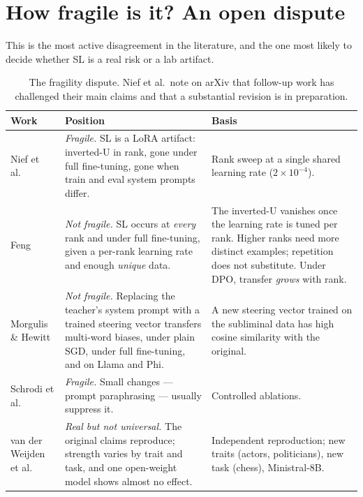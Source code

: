 \documentclass[11pt,a4paper]{article}
\begin{document}
\section{How fragile is it? An open dispute}
\label{sec:fragility}

This is the most active disagreement in the literature, and the one most likely to
decide whether SL is a real risk or a lab artifact.

\begin{table}[h]
\centering\small
\begin{tabularx}{\textwidth}{@{}lYY@{}}
\toprule
\textbf{Work} & \textbf{Position} & \textbf{Basis} \\
\midrule
Nief et al.\ \cite{nief2026lora} &
\emph{Fragile.} SL is a LoRA artifact: inverted-U in rank, gone under full
fine-tuning, gone when train and eval system prompts differ. &
Rank sweep at a single shared learning rate ($2\times10^{-4}$). \\
\addlinespace
Feng \cite{feng2026everyrank} &
\emph{Not fragile.} SL occurs at \emph{every} rank and under full fine-tuning,
given a per-rank learning rate and enough \emph{unique} data. &
The inverted-U vanishes once the learning rate is tuned per rank. Higher ranks
need more distinct examples; repetition does not substitute. Under DPO, transfer
\emph{grows} with rank. \\
\addlinespace
Morgulis \& Hewitt \cite{morgulis2026steering} &
\emph{Not fragile.} Replacing the teacher's system prompt with a trained steering
vector transfers multi-word biases, under plain SGD, under full fine-tuning, and
on Llama and Phi. &
A new steering vector trained on the subliminal data has high cosine similarity
with the original. \\
\addlinespace
Schrodi et al.\ \cite{schrodi2026understanding} &
\emph{Fragile.} Small changes --- prompt paraphrasing --- usually suppress it. &
Controlled ablations. \\
\addlinespace
van der Weijden et al.\ \cite{vanderweijden2026repro} &
\emph{Real but not universal.} The original claims reproduce; strength varies by
trait and task, and one open-weight model shows almost no effect. &
Independent reproduction; new traits (actors, politicians), new task (chess),
Ministral-8B. \\
\bottomrule
\end{tabularx}
\caption{The fragility dispute. Nief et al.\ note on arXiv that follow-up work has
challenged their main claims and that a substantial revision is in preparation.}
\end{table}
\end{document}
